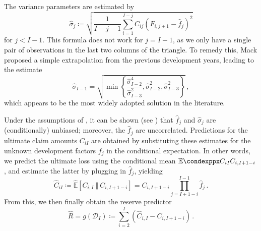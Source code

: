 \documentclass[a4paper]{book}
\begin{document}
The variance parameters are estimated by
\begin{equation}
  \widehat{\sigma}_j \coloneqq \sqrt{\frac{1}{I - j - 1}\sum_{i = 1}^{I-j} C_{ij}\left( F_{i, j + 1} - \widehat{f}_j \right)^2}
\end{equation}
for $j < I - 1$. This formula does not work for $j = I - 1$, as we only have a single pair of observations in the last two columns of the triangle. To remedy this, Mack proposed a simple extrapolation from the previous development years, leading to the estimate
\begin{equation}
  \widehat{\sigma}_{I - 1} = \sqrt{\min{ \left \{ \frac{\widehat{\sigma}^4_{I - 2}}{\widehat{\sigma}^2_{I - 3}}, \widehat{\sigma}^2_{I - 2}, \widehat{\sigma}^2_{I - 3} \right \} }} \,,
\end{equation}
which appears to be the most widely adopted solution in the literature.

Under the assumptions of , it can be shown (see \cite[17 \psqq]{wuthrich:stochastic-reserving}) that $\widehat{f}_j$ and $\widehat{\sigma}_j$ are (conditionally) unbiased; moreover, the $\widehat{f}_j$ are uncorrelated. Predictions for the ultimate claim amounts $C_{iI}$ are obtained by substituting these estimates for the unknown development factors $f_j$ in the conditional expectation. In other words, we predict the ultimate loss using the conditional mean $\condexpp{C_{iI}}{C_{i, I + 1 - i}}$, and estimate the latter by plugging in $\widehat{f}_j$, yielding
\begin{equation}
  \widehat{C}_{iI} \coloneqq \widehat{\mathbb{E}}[C_{i, I} \ \Vert \ C_{i, I + 1 - i}] = C_{i, I + 1 - i} \prod_{j = I + 1 - i}^{I - 1} \widehat{f}_j \,.
\end{equation}
From this, we then finally obtain the reserve predictor 
\begin{equation} \label{eq:reserve-predictor}
  \widehat{R} = g(\mathcal{D}_I) \coloneqq \sum_{i = 2}^I (\widehat{C}_{i, I} - C_{i, I + 1- i}) \,.
\end{equation}
\end{document}
